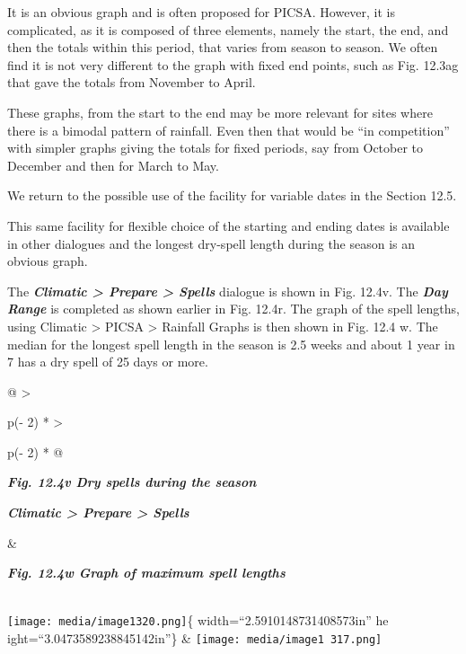 \documentclass[
  letterpaper,
  DIV=11,
  numbers=noendperiod]{scrreprt}
\begin{document}
It is an obvious graph and is often proposed for PICSA. However, it is
complicated, as it is composed of three elements, namely the start, the
end, and then the totals within this period, that varies from season to
season. We often find it is not very different to the graph with fixed
end points, such as Fig. 12.3ag that gave the totals from November to
April.

These graphs, from the start to the end may be more relevant for sites
where there is a bimodal pattern of rainfall. Even then that would be
``in competition'' with simpler graphs giving the totals for fixed
periods, say from October to December and then for March to May.

We return to the possible use of the facility for variable dates in the
Section 12.5.

This same facility for flexible choice of the starting and ending dates
is available in other dialogues and the longest dry-spell length during
the season is an obvious graph.

The \textbf{\emph{Climatic \textgreater{} Prepare \textgreater{}
Spells}} dialogue is shown in Fig. 12.4v. The \textbf{\emph{Day Range}}
is completed as shown earlier in Fig. 12.4r. The graph of the spell
lengths, using Climatic \textgreater{} PICSA \textgreater{} Rainfall
Graphs is then shown in Fig. 12.4 w. The median for the longest spell
length in the season is 2.5 weeks and about 1 year in 7 has a dry spell
of 25 days or more.

\begin{longtable}[]{@{}
  >{\raggedright\arraybackslash}p{(\columnwidth - 2\tabcolsep) * }
  >{\raggedright\arraybackslash}p{(\columnwidth - 2\tabcolsep) * }@{}}
\toprule\noalign{}
\begin{minipage}[b]{\linewidth}\raggedright
\textbf{\emph{Fig. 12.4v Dry spells during the season}}

\textbf{\emph{Climatic \textgreater{} Prepare \textgreater{} Spells}}
\end{minipage} & \begin{minipage}[b]{\linewidth}\raggedright
\textbf{\emph{Fig. 12.4w Graph of maximum spell lengths}}
\end{minipage} \\
\midrule\noalign{}
\endhead
\bottomrule\noalign{}
\endlastfoot
\texttt{[image: media/image1320.png]}\{ width=``2.5910148731408573in''
he ight=``3.0473589238845142in''\} &
\texttt{[image: media/image1 317.png]} \\
\end{longtable}
\end{document}
